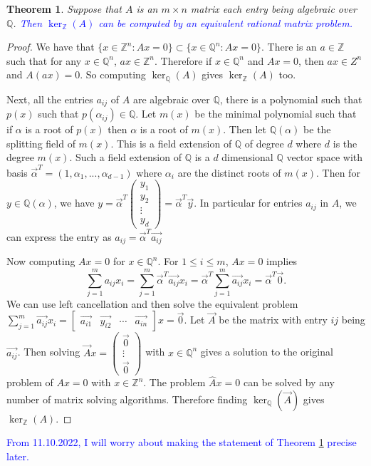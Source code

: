 \documentclass{article}
\renewcommand{\leq}{\leqslant}
\newcommand{\Z}[0]{\mathbb{Z}}		%
\newcommand{\Q}[0]{\mathbb{Q}}		%
\newtheorem{thm}{Theorem}[section]
\theoremstyle{definition}
\theoremstyle{remark}
\begin{document}
\begin{thm}\label{AlgebraicEnteries}
Suppose that $A$ is an $m\times n$ matrix each entry being algebraic over $\Q$. \textcolor{blue}{Then $\ker_\Z(A)$ can be computed by an equivalent rational matrix problem. }
\end{thm}
\begin{proof} 
We have that $\{x\in \Z^n : Ax = 0\} \subset \{x\in \Q^n : Ax =0\}$. There is an $a\in \Z$ such that for any  $x\in \Q^n$, $ax \in \Z^n$. Therefore if $x\in \Q^n$ and $Ax =0$, then $ax\in Z^n$ and $A(ax) = 0$. So computing $\ker_\Q(A)$ gives $\ker_\Z(A)$ too. 

Next, all the entries $a_{ij}$ of $A$ are algebraic over $\Q$, there is a polynomial such that $p(x)$ such that $p(\alpha_{ij}) \in \Q$. Let $m(x)$ be the minimal polynomial such that if $\alpha$ is a root of $p(x)$ then $\alpha$ is a root of $m(x)$. Then let $\Q(\alpha)$ be the splitting field of $m(x)$. This is a field extension of $\Q$ of degree $d$ where $d$ is the degree $m(x)$. Such a field extension of $\Q$ is a $d$ dimensional $\Q$ vector space with basis  $\vec{\alpha}^T = (1,\alpha_1,...,\alpha_{d-1})$ where $\alpha_i$ are the distinct roots of $m(x)$. Then for $y\in \Q(\alpha)$, we have $y =\vec{\alpha}^T \begin{pmatrix}
y_1\\ y_2\\ \vdots \\ y_d 
\end{pmatrix} = \vec{\alpha}^T \vec{y}$. In particular for entries $a_{ij} $ in $A$, we can express the entry as  $a_{ij}=\vec{\alpha}^T \vec{a_{ij}} $

Now computing $Ax =0$ for $x\in \Q^n$. For $1\leq i\leq m$, $Ax=0$ implies \begin{equation}
    \sum_{j=1}^m a_{ij} x_i = \sum_{j=1}^m \vec{\alpha}^T \vec{a_{ij}} x_i  = \vec{\alpha}^T\sum_{j=1}^m  \vec{a_{ij}} x_i  =\vec{\alpha}^T \vec{0}.
\end{equation} We can use left cancellation and then solve the equivalent problem $ \sum_{j=1}^m \vec{a_{ij}} x_i = \begin{bmatrix} \vec{a_{i1}} & \vec{y_{i2}} & \cdots & \vec{a_{in}} \end{bmatrix} x=  \vec{0}$.  Let $\vec{A}$ be the matrix with entry $ij$ being $\vec{a_{ij}}$. Then solving   $\vec{A} x  =  \begin{pmatrix}\vec{0} \\ \vdots \\ \vec{0}
\end{pmatrix}$ with $x\in \Q^n$ gives a solution to the original problem of $Ax = 0$ with $x\in\Z^n$. The problem  $\hat A x = 0$ can be solved by any number of matrix solving algorithms. Therefore finding $\ker_\Q(\vec{A})$ gives $\ker_\Z(A).$


\end{proof}
\textcolor{blue}{From 11.10.2022, I will worry about making the statement of Theorem \ref{AlgebraicEnteries} precise later.}
\end{document}
